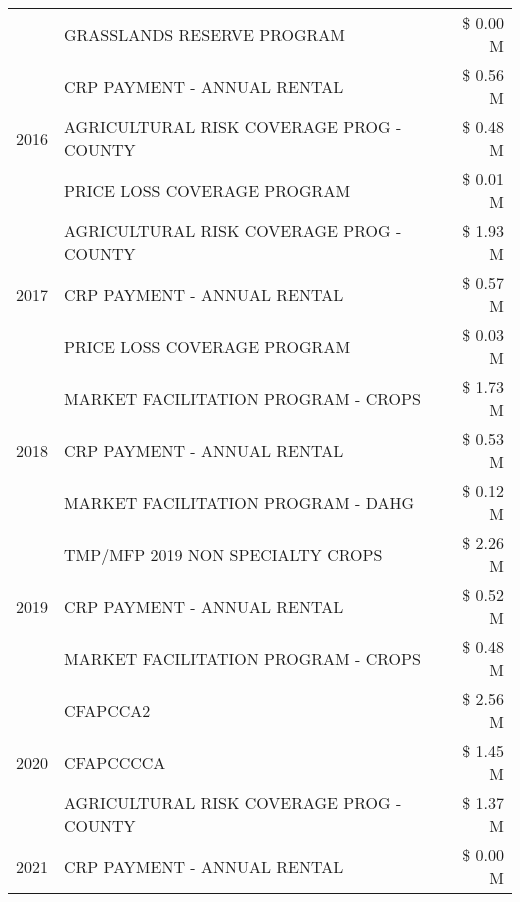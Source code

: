\begin{tabular}{llr}
 & GRASSLANDS RESERVE PROGRAM & \$ 0.00 M \\
\cline{1-3}
\multirow[t]{3}{*}{2016} & CRP PAYMENT - ANNUAL RENTAL                   & \$ 0.56 M \\
 & AGRICULTURAL RISK COVERAGE PROG - COUNTY      & \$ 0.48 M \\
 & PRICE LOSS COVERAGE PROGRAM                   & \$ 0.01 M \\
\cline{1-3}
\multirow[t]{3}{*}{2017} & AGRICULTURAL RISK COVERAGE PROG - COUNTY & \$ 1.93 M \\
 & CRP PAYMENT - ANNUAL RENTAL & \$ 0.57 M \\
 & PRICE LOSS COVERAGE PROGRAM & \$ 0.03 M \\
\cline{1-3}
\multirow[t]{3}{*}{2018} & MARKET FACILITATION PROGRAM - CROPS & \$ 1.73 M \\
 & CRP PAYMENT - ANNUAL RENTAL & \$ 0.53 M \\
 & MARKET FACILITATION PROGRAM - DAHG & \$ 0.12 M \\
\cline{1-3}
\multirow[t]{3}{*}{2019} & TMP/MFP 2019 NON SPECIALTY CROPS & \$ 2.26 M \\
 & CRP PAYMENT - ANNUAL RENTAL & \$ 0.52 M \\
 & MARKET FACILITATION PROGRAM - CROPS & \$ 0.48 M \\
\cline{1-3}
\multirow[t]{3}{*}{2020} & CFAPCCA2 & \$ 2.56 M \\
 & CFAPCCCCA & \$ 1.45 M \\
 & AGRICULTURAL RISK COVERAGE PROG - COUNTY & \$ 1.37 M \\
\cline{1-3}
2021 & CRP PAYMENT - ANNUAL RENTAL & \$ 0.00 M \\
\cline{1-3}
\bottomrule
\end{tabular}
